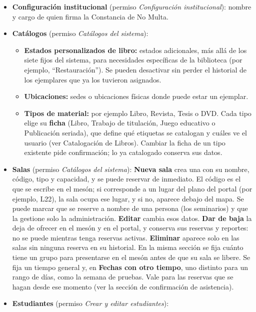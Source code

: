 \documentclass[11pt,a4paper]{report}
\begin{document}
\begin{itemize}
  \item \textbf{Configuración institucional} (permiso
  \textit{Configuración institucional}): nombre y cargo de quien firma la
  Constancia de No Multa.
  \item \textbf{Catálogos} (permiso \textit{Catálogos del sistema}):
  \begin{itemize}
    \item \textbf{Estados personalizados de libro:} estados adicionales,
    más allá de los siete fijos del sistema, para necesidades específicas
    de la biblioteca (por ejemplo, ``Restauración''). Se pueden desactivar
    sin perder el historial de los ejemplares que ya los tuvieron
    asignados.
    \item \textbf{Ubicaciones:} sedes o ubicaciones físicas donde puede
    estar un ejemplar.
    \item \textbf{Tipos de material:} por ejemplo Libro, Revista, Tesis o DVD.
    Cada tipo elige su \textbf{ficha} (Libro, Trabajo de titulación,
    Juego educativo o Publicación seriada), que define qué etiquetas se
    catalogan y cuáles ve el usuario (ver Catalogación de Libros).
    Cambiar la ficha de un tipo existente pide confirmación; lo ya
    catalogado conserva sus datos.
  \end{itemize}
  \item \textbf{Salas} (permiso \textit{Catálogos del sistema}):
  \textbf{Nueva sala} crea una con su nombre, código, tipo y capacidad, y se
  puede reservar de inmediato. El código es el que se escribe en el mesón; si
  corresponde a un lugar del plano del portal (por ejemplo, L22), la sala ocupa
  ese lugar, y si no, aparece debajo del mapa. Se puede marcar que se reserve a
  nombre de una persona (los seminarios) y que la gestione solo la
  administración. \textbf{Editar} cambia esos datos. \textbf{Dar de baja} la deja
  de ofrecer en el mesón y en el portal, y conserva sus reservas y reportes: no
  se puede mientras tenga reservas activas. \textbf{Eliminar} aparece solo en las
  salas sin ninguna reserva en su historial. En la misma sección se fija
  cuánto tiene un grupo para presentarse en el mesón antes de que su sala se
  libere. Se fija un tiempo general y, en \textbf{Fechas con otro tiempo}, uno
  distinto para un rango de días, como la semana de pruebas. Vale para las
  reservas que se hagan desde ese momento (ver la sección de confirmación de
  asistencia).
  \item \textbf{Estudiantes} (permiso \textit{Crear y editar estudiantes}):

\end{itemize}
\end{document}
